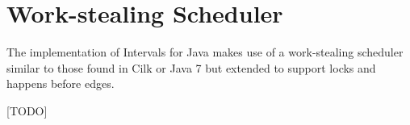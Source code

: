 
\chapter{Work-stealing Scheduler}
\label{chap:work-stealing-scheduler}

The implementation of Intervals for Java makes use of a work-stealing
scheduler similar to those found in Cilk \cite{Blumofe1995} or Java 7
\cite{Lea} but extended to support locks and happens before edges.

[TODO]

